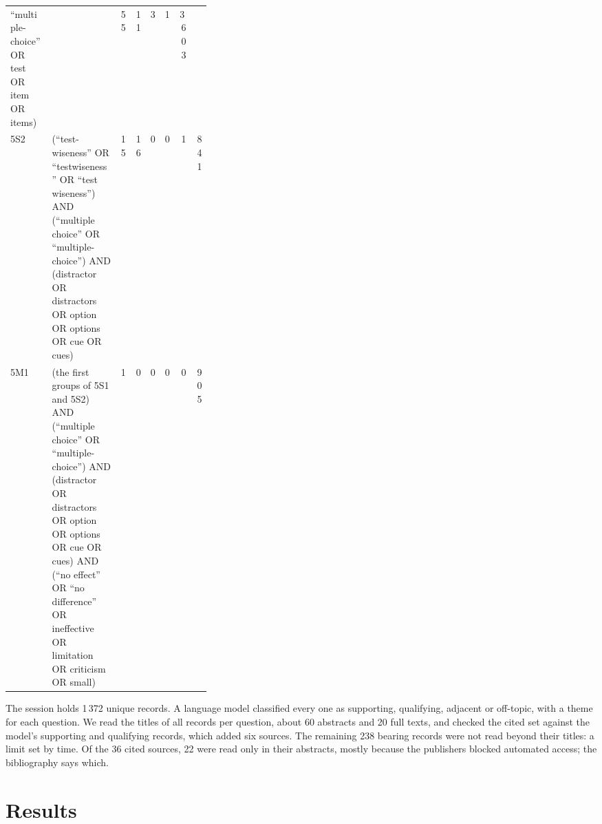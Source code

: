\begin{longtable}{@{}l>{\raggedright\arraybackslash}p{0.34\linewidth}
  rrrrrr@{}}
       \enquote{multiple-choice} OR test OR item OR items)
       & 39 & 55 & 11 & 3 & 1 & 3\,603 \\
    5S2 & (\enquote{test-wiseness} OR \enquote{testwiseness} OR
       \enquote{test wiseness}) AND (\enquote{multiple choice} OR
       \enquote{multiple-choice}) AND (distractor OR distractors OR
       option OR options OR cue OR cues)
       & 15 & 16 & 0 & 0 & 1 & 841 \\
    5M1 & (the first groups of 5S1 and 5S2) AND (\enquote{multiple choice}
       OR \enquote{multiple-choice}) AND (distractor OR distractors OR
       option OR options OR cue OR cues) AND (\enquote{no effect} OR
       \enquote{no difference} OR ineffective OR limitation OR criticism
       OR small)
       & 1 & 0 & 0 & 0 & 0 & 905 \\

\end{longtable}
\endgroup

The session holds 1\,372 unique records.  A language model classified
every one as supporting, qualifying, adjacent or off-topic, with a theme
for each question.  We read the titles of all records per question, about
60 abstracts and 20 full texts, and checked the cited set against the
model's supporting and qualifying records, which added six sources.  The
remaining 238 bearing records were not read beyond their titles: a limit
set by time.  Of the 36 cited sources, 22 were read only in their
abstracts, mostly because the publishers blocked automated access; the
bibliography says which.

\section{Results}
\label{sec:komplement-results}

